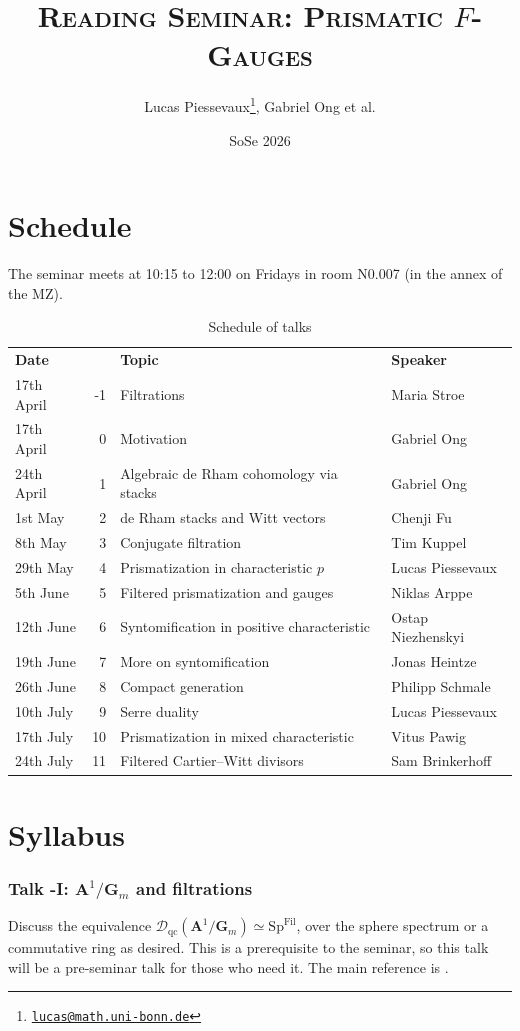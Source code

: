 \documentclass{article}
\title{{\Huge \scshape Reading Seminar: Prismatic $F$-Gauges}}
\author{ 
Lucas Piessevaux\thanks{\href{mailto:lucas@math.uni-bonn.de}{\texttt{lucas@math.uni-bonn.de}}}, Gabriel Ong et al.}
\date{SoSe 2026}
\begin{document}
\maketitle


\section*{Schedule}

The seminar meets at 10:15 to 12:00 on Fridays in room N0.007 (in the annex of the MZ). 
\begin{table}[H]
    \centering
    \begin{tabular}{lrll}
        \textbf{Date}  & & \textbf{Topic} & \textbf{Speaker}\\
       17th April &-1& Filtrations & Maria Stroe\\
       17th April &0& Motivation &  Gabriel Ong\\
        24th April &1& Algebraic de Rham cohomology via stacks & Gabriel Ong\\
        1st May &2& de Rham stacks and Witt vectors & Chenji Fu\\
        8th May &3& Conjugate filtration & Tim Kuppel \\
        29th May  &4& Prismatization in characteristic $p$ & Lucas Piessevaux \\
        5th June &5&  Filtered prismatization and gauges & Niklas Arppe \\
        12th June &6&Syntomification in positive characteristic & Ostap Niezhenskyi \\
        19th June &7& More on syntomification & Jonas Heintze \\
        26th June &8&Compact generation & Philipp Schmale\\
        10th July &9& Serre duality & Lucas Piessevaux \\
        17th July &10& Prismatization in mixed characteristic & Vitus Pawig\\
        24th July &11& Filtered Cartier--Witt divisors& Sam Brinkerhoff \\
    \end{tabular}
    \caption{Schedule of talks}
\end{table}


\section*{Syllabus}
\subsubsection*{Talk -I: $\mathbf{A}^1/\mathbf{G}_m$ and filtrations}
Discuss the equivalence $\mathscr{D}_{\mathrm{qc}}(\mathbf{A}^1/\mathbf{G}_m)\simeq \mathrm{Sp}^\mathrm{Fil}$, over the sphere spectrum or a commutative ring as desired. This is a prerequisite to the seminar, so this talk will be a pre-seminar talk for those who need it. The main reference is \cite{moulinos2021geometry}.
\end{document}
